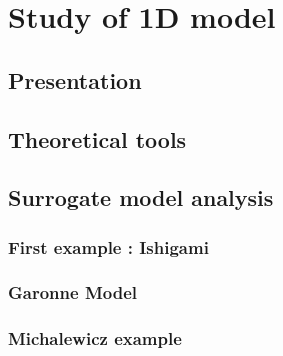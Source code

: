 \documentclass[hidelinks,12pt]{article}
\begin{document}
\section{Study of 1D model}
\subsection{Presentation}
\subsection{Theoretical tools}
\subsection{Surrogate model analysis}
\subsubsection{First example : Ishigami}
\subsubsection{Garonne Model }



\subsubsection{Michalewicz example}






\end{document}
